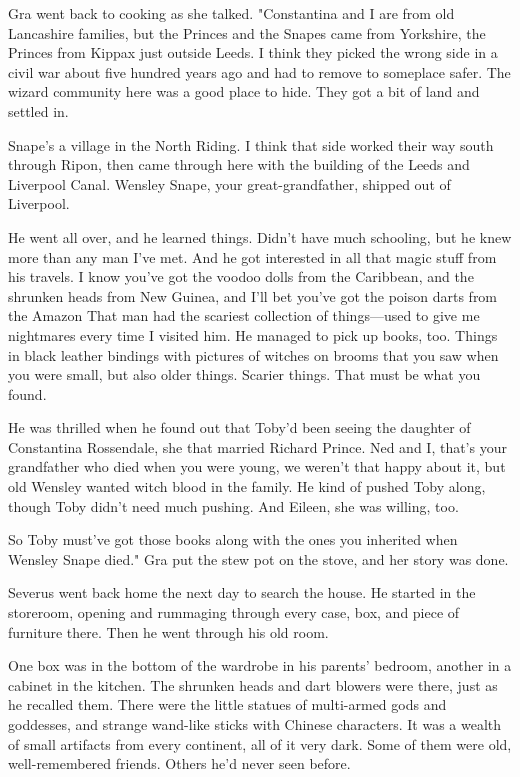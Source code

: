 Gra went back to cooking as she talked. "Constantina and I are from old Lancashire families, but the Princes and the Snapes came from Yorkshire, the Princes from Kippax just outside Leeds. I think they picked the wrong side in a civil war about five hundred years ago and had to remove to someplace safer. The wizard community here was a good place to hide. They got a bit of land and settled in.

\textooquote Snape's a village in the North Riding. I think that side worked their way south through Ripon, then came through here with the building of the Leeds and Liverpool Canal. Wensley Snape, your great-grandfather, shipped out of Liverpool.

\textooquote He went all over, and he learned things. Didn't have much schooling, but he knew more than any man I've met. And he got interested in all that magic stuff from his travels. I know you've got the voodoo dolls from the Caribbean, and the shrunken heads from New Guinea, and I'll bet you've got the poison darts from the Amazon{\el} That man had the scariest collection of things—used to give me nightmares every time I visited him. He managed to pick up books, too. Things in black leather bindings with pictures of witches on brooms that you saw when you were small, but also older things. Scarier things. That must be what you found.

\textooquote He was thrilled when he found out that Toby'd been seeing the daughter of Constantina Rossendale, she that married Richard Prince. Ned and I, that's your grandfather who died when you were young, we weren't that happy about it, but old Wensley wanted witch blood in the family. He kind of pushed Toby along, though Toby didn't need much pushing. And Eileen, she was willing, too.

\textooquote So Toby must've got those books along with the ones you inherited when Wensley Snape died." Gra put the stew pot on the stove, and her story was done.

Severus went back home the next day to search the house. He started in the storeroom, opening and rummaging through every case, box, and piece of furniture there. Then he went through his old room.

One box was in the bottom of the wardrobe in his parents' bedroom, another in a cabinet in the kitchen. The shrunken heads and dart blowers were there, just as he recalled them. There were the little statues of multi-armed gods and goddesses, and strange wand-like sticks with Chinese characters. It was a wealth of small artifacts from every continent, all of it very dark. Some of them were old, well-remembered friends. Others he'd never seen before.

